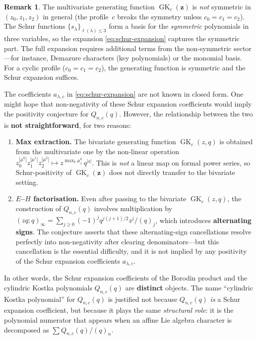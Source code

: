 \documentclass[11pt]{article}
\theoremstyle{plain}
\theoremstyle{definition}
\newtheorem{remark}[theorem]{Remark}
\newcommand{\GK}{\operatorname{GK}}
\newcommand{\qpoch}[2]{(#1;#2)_\infty}
\begin{document}
\begin{remark}
The multivariate generating function $\GK_c(\mathbf{z})$ is
\emph{not} symmetric in $(z_0, z_1, z_2)$ in general (the
profile~$c$ breaks the symmetry unless $c_0 = c_1 = c_2$).
The Schur functions $\{s_\lambda\}_{\ell(\lambda) \leq 3}$
form a basis for the \emph{symmetric} polynomials in three
variables, so the expansion \eqref{eq:schur-expansion} captures
the symmetric part.  The full expansion requires additional
terms from the non-symmetric sector---for instance, Demazure
characters (key polynomials) or the monomial basis.
For a cyclic profile ($c_0 = c_1 = c_2$), the generating
function is symmetric and the Schur expansion suffices.
\end{remark}

The coefficients $a_{\lambda,c}$ in \eqref{eq:schur-expansion}
are not known in closed form.  One might hope that non-negativity
of these Schur expansion coefficients would imply the
positivity conjecture for $Q_{n,c}(q)$.  However, the relationship
between the two is \textbf{not straightforward}, for two reasons:
\begin{enumerate}
  \item \textbf{Max extraction.}
    The bivariate generating function $\GK_c(z,q)$ is obtained
    from the multivariate one by the non-linear operation
    $z_0^{|\mu^0|} z_1^{|\mu^1|} z_2^{|\mu^2|}
    \mapsto z^{\max_k \mu^k_1}\, q^{|\mathfrak{c}|}$.
    This is \emph{not} a linear map on formal power series,
    so Schur-positivity of $\GK_c(\mathbf{z})$ does not directly
    transfer to the bivariate setting.
  \item \textbf{$E$--$H$ factorisation.}
    Even after passing to the bivariate $\GK_c(z,q)$, the
    construction of $Q_{n,c}(q)$ involves multiplication by
    $\qpoch{zq}{q} = \sum_{j \geq 0} (-1)^j q^{j(j+1)/2}
    z^j/(q)_j$, which introduces \textbf{alternating signs}.
    The conjecture asserts that these alternating-sign
    cancellations resolve perfectly into non-negativity after
    clearing denominators---but this cancellation is the
    essential difficulty, and it is not implied by any
    positivity of the Schur expansion coefficients $a_{\lambda,c}$.
\end{enumerate}

In other words, the Schur expansion coefficients of the Borodin
product and the cylindric Kostka polynomials $Q_{n,c}(q)$ are
\textbf{distinct} objects.  The name ``cylindric Kostka polynomial''
for $Q_{n,c}(q)$ is justified not because $Q_{n,c}(q)$ \emph{is}
a Schur expansion coefficient, but because it plays the same
\emph{structural role}: it is the polynomial numerator that appears
when an affine Lie algebra character is decomposed as
$\sum Q_{n,c}(q)/(q)_n$.
\end{document}
